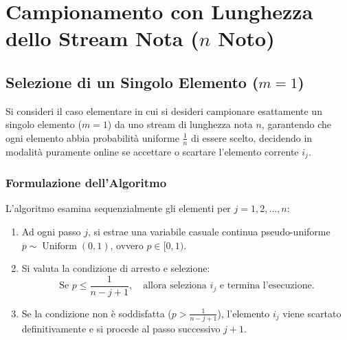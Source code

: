\FloatBarrier
\section[Campionamento con Lunghezza dello Stream Nota]{Campionamento con Lunghezza dello Stream Nota (\texorpdfstring{$n$}{n} Noto)}
\label{sec:sampling-known-n}

\subsection{Selezione di un Singolo Elemento (\texorpdfstring{$m = 1$}{m = 1})}
Si consideri il caso elementare in cui si desideri campionare esattamente un singolo elemento ($m = 1$) da uno stream di lunghezza nota $n$, garantendo che ogni elemento abbia probabilità uniforme $\frac{1}{n}$ di essere scelto, decidendo in modalità puramente online se accettare o scartare l'elemento corrente $i_j$.

\subsubsection{Formulazione dell'Algoritmo}
L'algoritmo esamina sequenzialmente gli elementi per $j = 1, 2, \dots, n$:
\begin{enumerate}
  \item Ad ogni passo $j$, si estrae una variabile casuale continua pseudo-uniforme $p \sim \operatorname{Uniform}(0, 1)$, ovvero $p \in [0, 1)$.
  \item Si valuta la condizione di arresto e selezione:
  \begin{equation}
    \text{Se } p \le \frac{1}{n - j + 1}, \quad \text{allora seleziona } i_j \text{ e termina l'esecuzione.}
    \label{eq:single-item-threshold}
  \end{equation}
  \item Se la condizione non è soddisfatta ($p > \frac{1}{n - j + 1}$), l'elemento $i_j$ viene scartato definitivamente e si procede al passo successivo $j+1$.
\end{enumerate}

\begin{algorithm}[H]
  \caption{Campionamento Online di un Singolo Elemento ($m = 1$, $n$ noto)}
  \label{alg:single-element-sampling}
\end{algorithm}


